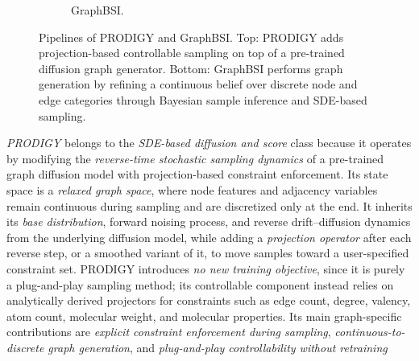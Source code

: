 \documentclass{article}
\begin{document}
\begin{figure}[htbp]
\begin{subfigure}[t]{\textwidth}
\caption{GraphBSI.}
\end{subfigure}

\caption{Pipelines of PRODIGY and GraphBSI. Top: PRODIGY adds projection-based controllable sampling on top of a pre-trained diffusion graph generator. Bottom: GraphBSI performs graph generation by refining a continuous belief over discrete node and edge categories through Bayesian sample inference and SDE-based sampling.}
\label{fig:prodigy_graphbsi_pipelines}
\end{figure}


\emph{PRODIGY} \cite{sharma2024plug} belongs to the \emph{SDE-based diffusion and score} class because it operates by modifying the \emph{reverse-time stochastic sampling dynamics} of a pre-trained graph diffusion model with projection-based constraint enforcement. Its state space is a \emph{relaxed graph space}, where node features and adjacency variables remain continuous during sampling and are discretized only at the end. It inherits its \emph{base distribution}, forward noising process, and reverse drift--diffusion dynamics from the underlying diffusion model, while adding a \emph{projection operator} after each reverse step, or a smoothed variant of it, to move samples toward a user-specified constraint set. PRODIGY introduces \emph{no new training objective}, since it is purely a plug-and-play sampling method; its controllable component instead relies on analytically derived projectors for constraints such as edge count, degree, valency, atom count, molecular weight, and molecular properties. Its main graph-specific contributions are \emph{explicit constraint enforcement during sampling}, \emph{continuous-to-discrete graph generation}, and \emph{plug-and-play controllability without retraining}
\end{document}
